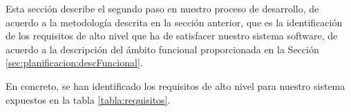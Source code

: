 Esta sección describe el segundo paso en nuestro proceso de desarrollo, de acuerdo a la metodología descrita en la sección anterior, que es la identificación de los requisitos de alto nivel que ha de satisfacer nuestro sistema software, de acuerdo a la descripción del ámbito funcional proporcionada en la Sección~ \ref{sec:planificacion:descFuncional}.
\newline
%
%
%
%
%
%
%

En concreto, se han identificado los requisitos de alto nivel para nuestro sistema expuestos en la tabla \ref{tabla:requisitos}.


